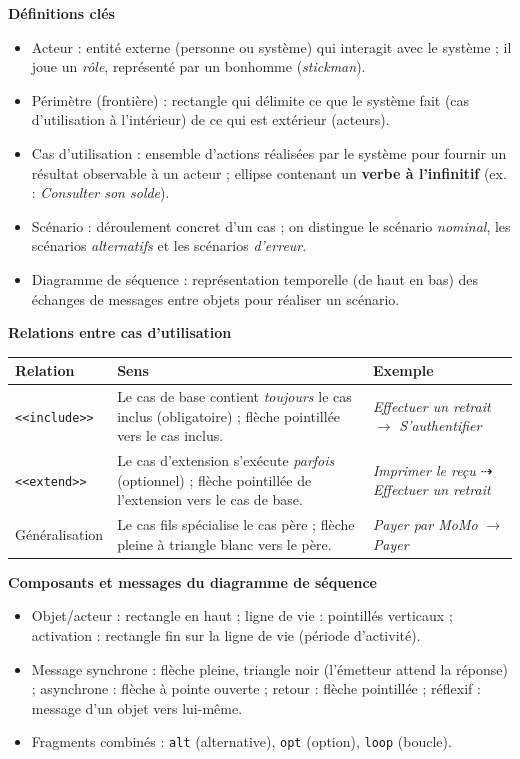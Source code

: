 \documentclass[11pt]{article}
\newcommand{\cle}[1]{{\popxbold\color{popdark}#1}}
\begin{document}
\begin{bilan}
\textbf{Définitions clés}
\begin{itemize}
  \item \cle{Acteur} : entité externe (personne ou système) qui interagit avec le système ; il joue un \emph{rôle}, représenté par un bonhomme (\emph{stickman}).
  \item \cle{Périmètre} (frontière) : rectangle qui délimite ce que le système fait (cas d'utilisation à l'intérieur) de ce qui est extérieur (acteurs).
  \item \cle{Cas d'utilisation} : ensemble d'actions réalisées par le système pour fournir un résultat observable à un acteur ; ellipse contenant un \textbf{verbe à l'infinitif} (ex. : \emph{Consulter son solde}).
  \item \cle{Scénario} : déroulement concret d'un cas ; on distingue le scénario \emph{nominal}, les scénarios \emph{alternatifs} et les scénarios \emph{d'erreur}.
  \item \cle{Diagramme de séquence} : représentation temporelle (de haut en bas) des échanges de messages entre objets pour réaliser un scénario.
\end{itemize}

\textbf{Relations entre cas d'utilisation}
\begin{center}
\begin{tabularx}{\linewidth}{|l|X|X|}
\hline
\rowcolor{popblueL} \textbf{Relation} & \textbf{Sens} & \textbf{Exemple} \\
\hline
\texttt{<<include>>} & Le cas de base contient \emph{toujours} le cas inclus (obligatoire) ; flèche pointillée vers le cas inclus. & \emph{Effectuer un retrait} $\rightarrow$ \emph{S'authentifier} \\
\hline
\texttt{<<extend>>} & Le cas d'extension s'exécute \emph{parfois} (optionnel) ; flèche pointillée de l'extension vers le cas de base. & \emph{Imprimer le reçu} $\dashrightarrow$ \emph{Effectuer un retrait} \\
\hline
Généralisation & Le cas fils spécialise le cas père ; flèche pleine à triangle blanc vers le père. & \emph{Payer par MoMo} $\longrightarrow$ \emph{Payer} \\
\hline
\end{tabularx}
\end{center}

\textbf{Composants et messages du diagramme de séquence}
\begin{itemize}
  \item \cle{Objet/acteur} : rectangle en haut ; \cle{ligne de vie} : pointillés verticaux ; \cle{activation} : rectangle fin sur la ligne de vie (période d'activité).
  \item Message \cle{synchrone} : flèche pleine, triangle noir (l'émetteur attend la réponse) ; \cle{asynchrone} : flèche à pointe ouverte ; \cle{retour} : flèche pointillée ; \cle{réflexif} : message d'un objet vers lui-même.
  \item Fragments combinés : \texttt{alt} (alternative), \texttt{opt} (option), \texttt{loop} (boucle).
\end{itemize}


\end{bilan}
\end{document}
